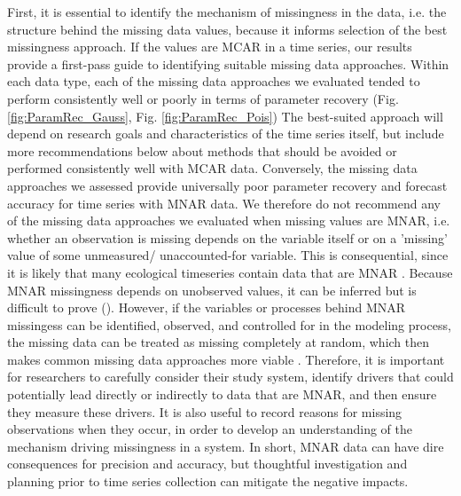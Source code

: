 \documentclass{article}
\begin{document}
First, it is essential to identify the mechanism of missingness in the data, i.e. the structure behind the missing data values, because it informs selection of the best missingness approach. If the values are MCAR in a time series, our results provide a first-pass guide to identifying suitable missing data approaches. Within each data type, each of the missing data approaches we evaluated tended to perform consistently well or poorly in terms of parameter recovery (Fig. \ref{fig:ParamRec_Gauss}, Fig. \ref{fig:ParamRec_Pois}) The best-suited approach will depend on research goals and characteristics of the time series itself, but include more recommendations below about methods that should be avoided or performed consistently well with MCAR data. Conversely, the missing data approaches we assessed provide universally poor parameter recovery and forecast accuracy for time series with MNAR data. We therefore do not recommend any of the missing data approaches we evaluated when missing values are MNAR, i.e. whether an observation is missing depends on the variable itself or on a 'missing' value of some unmeasured/ unaccounted-for variable. %
This is consequential, since it is likely that many ecological timeseries contain data that are MNAR \citep{bowler2025treating}. Because MNAR missingness depends on unobserved values, it can be inferred but is difficult to prove (\citep{nakagawa_missing_2015}). However, if the variables or processes behind MNAR missingess can be identified, observed, and controlled for in the modeling process, the missing data can be treated as missing completely at random, which then makes common missing data approaches more viable \citep{newman_missing_2014, nakagawa_missing_2015}. Therefore, it is important for researchers to carefully consider their study system, identify drivers that could potentially lead directly or indirectly to data that are MNAR, and then ensure they measure these drivers. It is also useful to record reasons for missing observations when they occur, in order to develop an understanding of the mechanism driving missingness in a system. In short, MNAR data can have dire consequences for precision and accuracy, but thoughtful investigation and planning prior to time series collection can mitigate the negative impacts.  
\end{document}
